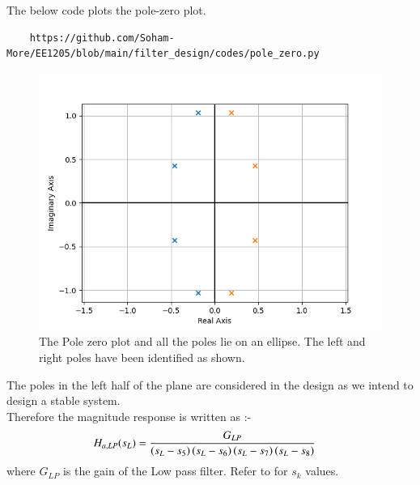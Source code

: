 \documentclass{article}
\begin{document}
\begin{enumerate}
The below code plots the pole-zero plot.
\begin{lstlisting}
    https://github.com/Soham-More/EE1205/blob/main/filter_design/codes/pole_zero.py
\end{lstlisting}
\begin{figure}[ht]
\centering
\includegraphics[width=1\columnwidth]{figs/polezero.png}
\caption{The Pole zero plot and all the poles lie on an ellipse. The left and right poles have been identified as shown.}
\label{fig:pole_zero_plt}
\end{figure}
The poles in the left half of the plane are considered in the design as we intend to design a stable system.\\
Therefore the magnitude response is written as :-
\begin{align}
    H_{a,LP}(s_L) &= \frac{G_{LP}}{\left(s_L-s_5\right)\left(s_L-s_6\right)\left(s_L-s_7\right)\left(s_L-s_8\right)}
\end{align}
where $G_{LP}$ is the gain of the Low pass filter. Refer to  for $s_k$ values.\\


\end{enumerate}
\end{document}
